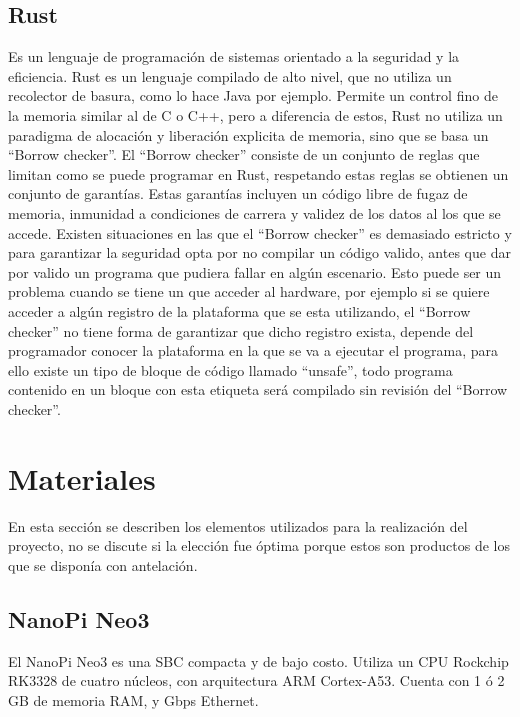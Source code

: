 \documentclass[12pt,letterpaper]{article}     %
\begin{document}
\subsection{Rust}

Es un lenguaje de programación de sistemas orientado a la seguridad y la eficiencia. 
Rust es un lenguaje compilado de alto nivel, que no utiliza un recolector de basura, 
como lo hace Java por ejemplo. Permite un control fino de la memoria similar al de 
C o C++, pero a diferencia de estos, Rust no utiliza un paradigma de alocación y 
liberación explicita de memoria, sino que se basa un ``Borrow checker''.
El ``Borrow checker'' consiste de un conjunto de reglas que limitan como se puede 
programar en Rust, respetando estas reglas se obtienen un conjunto de garantías.
Estas garantías incluyen un código libre de fugaz de memoria, inmunidad a condiciones 
de carrera y validez de los datos al los que se accede. 
Existen situaciones en las que el ``Borrow checker'' es demasiado estricto y para
garantizar la seguridad opta por no compilar un código valido, antes que dar por valido
un programa que pudiera fallar en algún escenario. Esto puede ser un problema cuando 
se tiene un que acceder al hardware, por ejemplo si se quiere acceder a algún registro 
de la plataforma que se esta utilizando, el ``Borrow checker'' no tiene forma de garantizar
que dicho registro exista, depende del programador conocer la plataforma en la que se va a 
ejecutar el programa, para ello existe un tipo de bloque de código llamado ``unsafe'', todo
programa contenido en un bloque con esta etiqueta será compilado sin revisión del ``Borrow checker''.

\clearpage
\section{Materiales}

En esta sección se describen los elementos utilizados para la realización del proyecto, no se discute si la
elección fue óptima porque estos son productos de los que se disponía con antelación.

\subsection{NanoPi Neo3}

El NanoPi Neo3 es una SBC compacta y de bajo costo. Utiliza un CPU Rockchip RK3328 de cuatro núcleos, con
arquitectura ARM Cortex-A53. Cuenta con 1 ó 2 GB de memoria RAM, y Gbps Ethernet. 
\end{document}
